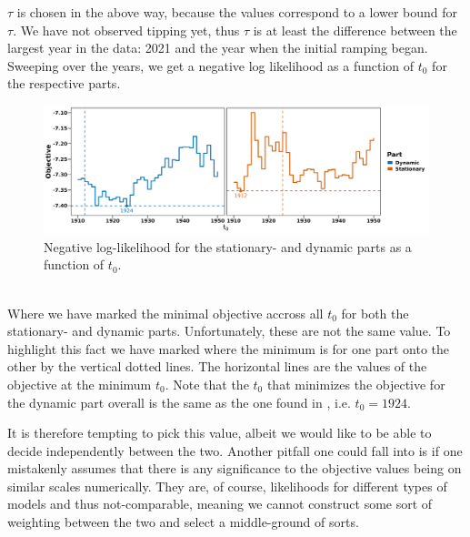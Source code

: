 $\tau$ is chosen in the above way, because the values correspond to a lower bound for $\tau$. We have not observed tipping yet, thus $\tau$ is at least the difference between the largest year in the data: 2021 and the year when the initial ramping began. Sweeping over the years, we get a negative log likelihood as a function of $t_0$ for the respective parts.
\begin{figure}[h!]
    \begin{center}
    \includegraphics[scale = .095]{figures/ramping_year_likelihood_plot.jpeg}
    \caption{Negative log-likelihood for the stationary- and dynamic parts as a function of $t_0$.}
    \label{figure:negLoglikRamping}        
    \end{center}
\end{figure}\\
Where we have marked the minimal objective accross all $t_0$ for both the stationary- and dynamic parts. Unfortunately, these are not the same value. To highlight this fact we have marked where the minimum is for one part onto the other by the vertical dotted lines. The horizontal lines are the values of the objective at the minimum $t_0$. Note that the $t_0$ that minimizes the objective for the dynamic part overall is the same as the one found in \cite{Ditlevsen2023}, i.e. $t_0 = 1924$.

It is therefore tempting to pick this value, albeit we would like to be able to decide independently between the two. Another pitfall one could fall into is if one mistakenly assumes that there is any significance to the objective values being on similar scales numerically. They are, of course, likelihoods for different types of models and thus not-comparable, meaning we cannot construct some sort of weighting between the two and select a middle-ground of sorts.

